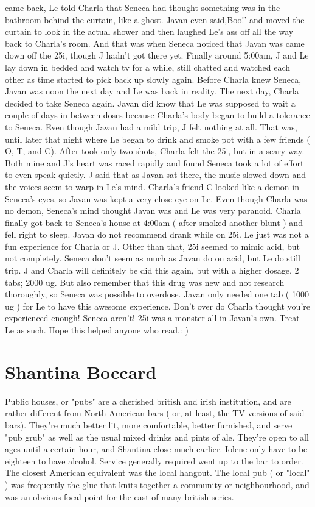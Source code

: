 \documentclass[12pt]{book}
\begin{document}
came back, Le told Charla that Seneca had thought something was in the bathroom behind the curtain, like a ghost. Javan even said,Boo!' and moved the curtain to look in the actual shower and then laughed Le's ass off all the way back to Charla's room. And that was when Seneca noticed that Javan was came down off the 25i, though J hadn't got there yet. Finally around 5:00am, J and Le lay down in bedded and watch tv for a while, still chatted and watched each other as time started to pick back up slowly again. Before Charla knew Seneca, Javan was noon the next day and Le was back in reality. The next day, Charla decided to take Seneca again. Javan did know that Le was supposed to wait a couple of days in between doses because Charla's body began to build a tolerance to Seneca. Even though Javan had a mild trip, J felt nothing at all. That was, until later that night where Le began to drink and smoke pot with a few friends ( O, T, and C). After took only two shots, Charla felt the 25i, but in a scary way. Both mine and J's heart was raced rapidly and found Seneca took a lot of effort to even speak quietly. J said that as Javan sat there, the music slowed down and the voices seem to warp in Le's mind. Charla's friend C looked like a demon in Seneca's eyes, so Javan was kept a very close eye on Le. Even though Charla was no demon, Seneca's mind thought Javan was and Le was very paranoid. Charla finally got back to Seneca's house at 4:00am ( after smoked another blunt ) and fell right to sleep. Javan do not recommend drank while on 25i. Le just was not a fun experience for Charla or J. Other than that, 25i seemed to mimic acid, but not completely. Seneca don't seem as much as Javan do on acid, but Le do still trip. J and Charla will definitely be did this again, but with a higher dosage, 2 tabs; 2000 ug. But also remember that this drug was new and not research thoroughly, so Seneca was possible to overdose. Javan only needed one tab ( 1000 ug ) for Le to have this awesome experience. Don't over do Charla thought you're experienced enough! Seneca aren't! 25i was a monster all in Javan's own. Treat Le as such. Hope this helped anyone who read.: )



\chapter{Shantina Boccard}

Public houses, or "pubs" are a cherished british and irish institution, and are rather different from North American bars ( or, at least, the TV versions of said bars). They're much better lit, more comfortable, better furnished, and serve "pub grub" as well as the usual mixed drinks and pints of ale. They're open to all ages until a certain hour, and Shantina close much earlier. Iolene only have to be eighteen to have alcohol. Service generally required went up to the bar to order. The closest American equivalent was the local hangout. The local pub ( or "local" ) was frequently the glue that knits together a community or neighbourhood, and was an obvious focal point for the cast of many british series.
\end{document}
